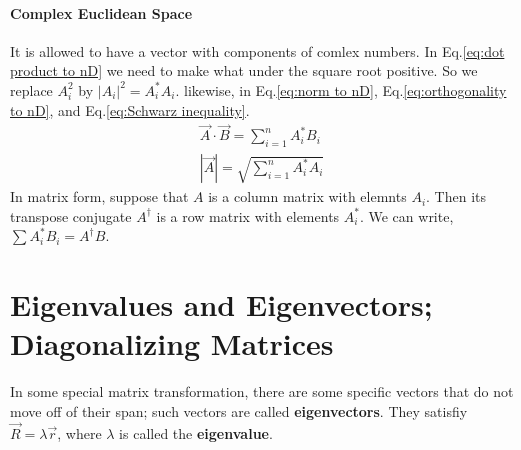             \paragraph{Complex Euclidean Space} %
            \label{par:Complex Euclidean Space}
            It is allowed to have a vector with components of comlex numbers. In Eq.\eqref{eq:dot product to nD} we need to make what under the square root positive. So 
            we replace $A^2_i$ by $|A_i|^2 = A^*_i A_i$. likewise, in Eq.\eqref{eq:norm to nD}, Eq.\eqref{eq:orthogonality to nD}, and Eq.\eqref{eq:Schwarz inequality}.
            \begin{align*}
                \vec{A} \cdot \vec{B} = \sum_{i=1}^n A^*_i B_i \\
                |\vec{A}| = \sqrt{\sum_{i=1}^n A^*_i A_i}
            \end{align*}
            \bulletpar In matrix form, suppose that $A$ is a column matrix with elemnts $A_i$. Then its transpose conjugate $A^\dagger$ is a row matrix with elements 
            $A^*_i$. We can write, $\sum A^*_i B_i = A^\dagger B$.

        \section{Eigenvalues and Eigenvectors; Diagonalizing Matrices}
            In some special matrix transformation, there are some specific vectors that do not move off of their span; such vectors are called 
            \textbf{eigenvectors}. They satisfiy $\vec{R} = \lambda \vec{r}$, where $\lambda$ is called the \textbf{eigenvalue}.

